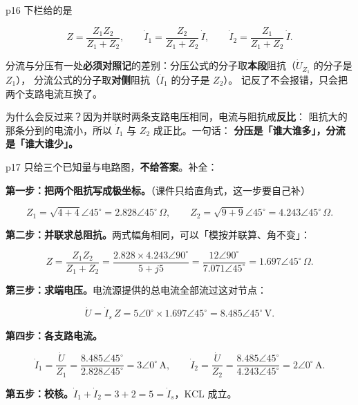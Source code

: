 \documentclass[11pt]{ctexart}
\begin{document}

p16 下栏给的是

\[ Z=\frac{Z_1Z_2}{Z_1+Z_2} ,\qquad
   \dot I_1=\frac{Z_2}{Z_1+Z_2}\,\dot I ,\qquad
   \dot I_2=\frac{Z_1}{Z_1+Z_2}\,\dot I . \]

分流与分压有一处\textbf{必须对照记}的差别：分压公式的分子取\textbf{本段}阻抗（$\dot U_{Z_1}$ 的分子是 $Z_1$），
分流公式的分子取\textbf{对侧}阻抗（$\dot I_1$ 的分子是 $Z_2$）。
记反了不会报错，只会把两个支路电流互换了。

为什么会反过来？因为并联时两条支路电压相同，电流与阻抗成\textbf{反比}：
阻抗大的那条分到的电流小，所以 $\dot I_1$ 与 $Z_2$ 成正比。一句话：
\textbf{分压是「谁大谁多」，分流是「谁大谁少」。}


p17 只给三个已知量与电路图，\textbf{不给答案}。补全：


\textbf{第一步：把两个阻抗写成极坐标。}（课件只给直角式，这一步要自己补）

\[ Z_1=\sqrt{4+4}\angle45^\circ=2.828\angle45^\circ\,\Omega ,\qquad
   Z_2=\sqrt{9+9}\angle45^\circ=4.243\angle45^\circ\,\Omega . \]

\textbf{第二步：并联求总阻抗。}两式幅角相同，可以「模按并联算、角不变」：

\[ Z=\frac{Z_1Z_2}{Z_1+Z_2}
   =\frac{2.828\times4.243\angle90^\circ}{5+j5}
   =\frac{12\angle90^\circ}{7.071\angle45^\circ}
   =1.697\angle45^\circ\,\Omega . \]

\textbf{第三步：求端电压。}电流源提供的总电流全部流过这对节点：

\[ \dot U=\dot I_s\,Z=5\angle0^\circ\times1.697\angle45^\circ=8.485\angle45^\circ\,\mathrm{V} . \]

\textbf{第四步：各支路电流。}

\[ \dot I_1=\frac{\dot U}{Z_1}=\frac{8.485\angle45^\circ}{2.828\angle45^\circ}=3\angle0^\circ\,\mathrm{A} ,\qquad
   \dot I_2=\frac{\dot U}{Z_2}=\frac{8.485\angle45^\circ}{4.243\angle45^\circ}=2\angle0^\circ\,\mathrm{A} . \]

\textbf{第五步：校核。}$\dot I_1+\dot I_2=3+2=5=\dot I_s$，KCL 成立。
\end{document}
